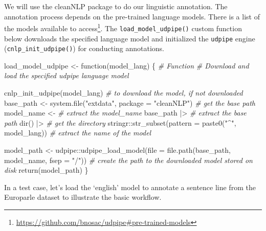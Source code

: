 \documentclass[
  letterpaper,
]{latex/krantz}
\newenvironment{Shaded}{\begin{snugshade}}{\end{snugshade}}
\newcommand{\AttributeTok}[1]{\textcolor[rgb]{0.00,0.00,0.00}{#1}}
\newcommand{\CommentTok}[1]{\textcolor[rgb]{0.00,0.00,0.00}{\textit{#1}}}
\newcommand{\ControlFlowTok}[1]{\textcolor[rgb]{0.00,0.00,0.00}{#1}}
\newcommand{\FunctionTok}[1]{\textcolor[rgb]{0.00,0.00,0.00}{#1}}
\newcommand{\NormalTok}[1]{\textcolor[rgb]{0.00,0.00,0.00}{#1}}
\newcommand{\OtherTok}[1]{\textcolor[rgb]{0.00,0.00,0.00}{#1}}
\newcommand{\SpecialCharTok}[1]{\textcolor[rgb]{0.00,0.00,0.00}{#1}}
\newcommand{\StringTok}[1]{\textcolor[rgb]{0.00,0.00,0.00}{#1}}
\DeclareRobustCommand{\href}[2]{#2\footnote{\url{#1}}}
\begin{document}
We will use the cleanNLP package to do our linguistic annotation. The
annotation process depends on the pre-trained language models. There is
\href{https://github.com/bnosac/udpipe\#pre-trained-models}{a list of
the models available to access}. The \texttt{load\_model\_udpipe()}
custom function below downloads the specified language model and
initialized the \texttt{udpipe} engine (\texttt{cnlp\_init\_udpipe()})
for conducting annotations.

\begin{Shaded}
\begin{Highlighting}[]
\NormalTok{load\_model\_udpipe }\OtherTok{\textless{}{-}} \ControlFlowTok{function}\NormalTok{(model\_lang) \{}
  \CommentTok{\# Function}
  \CommentTok{\# Download and load the specified udpipe language model}
  
  \FunctionTok{cnlp\_init\_udpipe}\NormalTok{(model\_lang) }\CommentTok{\# to download the model, if not downloaded}
\NormalTok{base\_path }\OtherTok{\textless{}{-}} \FunctionTok{system.file}\NormalTok{(}\StringTok{"extdata"}\NormalTok{, }\AttributeTok{package =} \StringTok{"cleanNLP"}\NormalTok{) }\CommentTok{\# get the base path}
\NormalTok{  model\_name }\OtherTok{\textless{}{-}} \CommentTok{\# extract the model\_name}
\NormalTok{    base\_path }\SpecialCharTok{|\textgreater{}} \CommentTok{\# extract the base path}
    \FunctionTok{dir}\NormalTok{() }\SpecialCharTok{|\textgreater{}} \CommentTok{\# get the directory}
\NormalTok{    stringr}\SpecialCharTok{::}\FunctionTok{str\_subset}\NormalTok{(}\AttributeTok{pattern =} \FunctionTok{paste0}\NormalTok{(}\StringTok{"\^{}"}\NormalTok{, model\_lang)) }\CommentTok{\# extract the name of the model}
  
\NormalTok{  model\_path }\OtherTok{\textless{}{-}}\NormalTok{ udpipe}\SpecialCharTok{::}\FunctionTok{udpipe\_load\_model}\NormalTok{(}\AttributeTok{file =} \FunctionTok{file.path}\NormalTok{(base\_path, model\_name, }\AttributeTok{fsep =} \StringTok{"/"}\NormalTok{)) }\CommentTok{\# create the path to the downloaded model stored on disk}
    \FunctionTok{return}\NormalTok{(model\_path)}
\NormalTok{\}}
\end{Highlighting}
\end{Shaded}

In a test case, let's load the `english' model to annotate a sentence
line from the Europarle dataset to illustrate the basic workflow.
\end{document}
